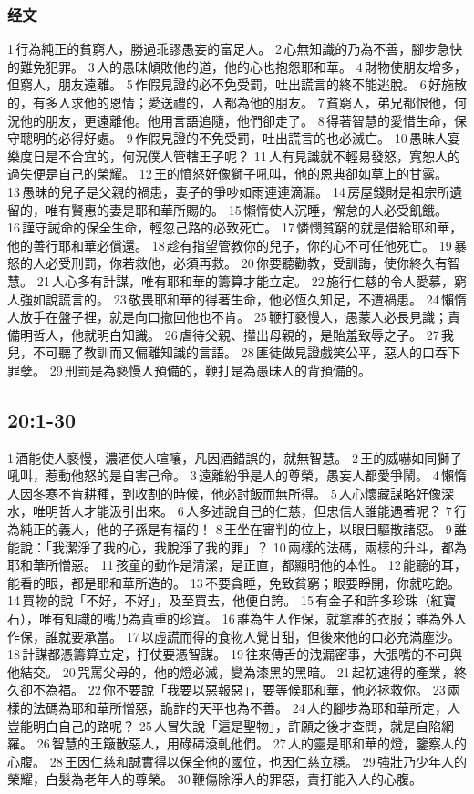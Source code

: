 \subsubsection{经文}
1 行為純正的貧窮人，勝過乖謬愚妄的富足人。 2 心無知識的乃為不善，腳步急快的難免犯罪。 3 人的愚昧傾敗他的道，他的心也抱怨耶和華。 4 財物使朋友增多，但窮人，朋友遠離。 5 作假見證的必不免受罰，吐出謊言的終不能逃脫。 6 好施散的，有多人求他的恩情；愛送禮的，人都為他的朋友。 7 貧窮人，弟兄都恨他，何況他的朋友，更遠離他。他用言語追隨，他們卻走了。 8 得著智慧的愛惜生命，保守聰明的必得好處。 9 作假見證的不免受罰，吐出謊言的也必滅亡。 10 愚昧人宴樂度日是不合宜的，何況僕人管轄王子呢？ 11 人有見識就不輕易發怒，寬恕人的過失便是自己的榮耀。 12 王的憤怒好像獅子吼叫，他的恩典卻如草上的甘露。 13 愚昧的兒子是父親的禍患，妻子的爭吵如雨連連滴漏。 14 房屋錢財是祖宗所遺留的，唯有賢惠的妻是耶和華所賜的。 15 懶惰使人沉睡，懈怠的人必受飢餓。 16 謹守誡命的保全生命，輕忽己路的必致死亡。 17 憐憫貧窮的就是借給耶和華，他的善行耶和華必償還。 18 趁有指望管教你的兒子，你的心不可任他死亡。 19 暴怒的人必受刑罰，你若救他，必須再救。 20 你要聽勸教，受訓誨，使你終久有智慧。 21 人心多有計謀，唯有耶和華的籌算才能立定。 22 施行仁慈的令人愛慕，窮人強如說謊言的。 23 敬畏耶和華的得著生命，他必恆久知足，不遭禍患。 24 懶惰人放手在盤子裡，就是向口撤回他也不肯。 25 鞭打褻慢人，愚蒙人必長見識；責備明哲人，他就明白知識。 26 虐待父親、攆出母親的，是貽羞致辱之子。 27 我兒，不可聽了教訓而又偏離知識的言語。 28 匪徒做見證戲笑公平，惡人的口吞下罪孽。 29 刑罰是為褻慢人預備的，鞭打是為愚昧人的背預備的。


\subsection{  20:1-30}
1 酒能使人褻慢，濃酒使人喧嚷，凡因酒錯誤的，就無智慧。 2 王的威嚇如同獅子吼叫，惹動他怒的是自害己命。 3 遠離紛爭是人的尊榮，愚妄人都愛爭鬧。 4 懶惰人因冬寒不肯耕種，到收割的時候，他必討飯而無所得。 5 人心懷藏謀略好像深水，唯明哲人才能汲引出來。 6 人多述說自己的仁慈，但忠信人誰能遇著呢？ 7 行為純正的義人，他的子孫是有福的！ 8 王坐在審判的位上，以眼目驅散諸惡。 9 誰能說：「我潔淨了我的心，我脫淨了我的罪」？ 10 兩樣的法碼，兩樣的升斗，都為耶和華所憎惡。 11 孩童的動作是清潔，是正直，都顯明他的本性。 12 能聽的耳，能看的眼，都是耶和華所造的。 13 不要貪睡，免致貧窮；眼要睜開，你就吃飽。 14 買物的說「不好，不好」，及至買去，他便自誇。 15 有金子和許多珍珠（紅寶石），唯有知識的嘴乃為貴重的珍寶。 16 誰為生人作保，就拿誰的衣服；誰為外人作保，誰就要承當。 17 以虛謊而得的食物人覺甘甜，但後來他的口必充滿塵沙。 18 計謀都憑籌算立定，打仗要憑智謀。 19 往來傳舌的洩漏密事，大張嘴的不可與他結交。 20 咒罵父母的，他的燈必滅，變為漆黑的黑暗。 21 起初速得的產業，終久卻不為福。 22 你不要說「我要以惡報惡」，要等候耶和華，他必拯救你。 23 兩樣的法碼為耶和華所憎惡，詭詐的天平也為不善。 24 人的腳步為耶和華所定，人豈能明白自己的路呢？ 25 人冒失說「這是聖物」，許願之後才查問，就是自陷網羅。 26 智慧的王簸散惡人，用碌碡滾軋他們。 27 人的靈是耶和華的燈，鑒察人的心腹。 28 王因仁慈和誠實得以保全他的國位，也因仁慈立穩。 29 強壯乃少年人的榮耀，白髮為老年人的尊榮。 30 鞭傷除淨人的罪惡，責打能入人的心腹。


